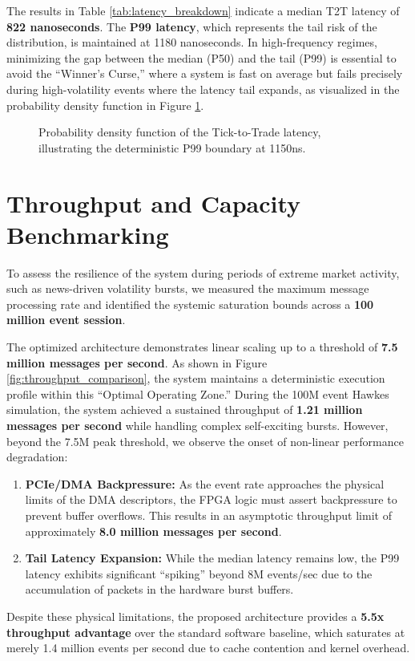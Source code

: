 The results in Table \ref{tab:latency_breakdown} indicate a median T2T latency of \textbf{822 nanoseconds}. The \textbf{P99 latency}, which represents the tail risk of the distribution, is maintained at 1180 nanoseconds. 
 In high-frequency regimes, minimizing the gap between the median (P50) and the tail (P99) is essential to avoid the ``Winner's Curse,'' where a system is fast on average but fails precisely during high-volatility events where the latency tail expands, as visualized in the probability density function in Figure \ref{fig:latency_hist}.

\begin{figure}
    \centering
    
    \caption{Probability density function of the Tick-to-Trade latency, illustrating the deterministic P99 boundary at 1150ns.}
    \label{fig:latency_hist}
\end{figure}
\clearpage

\section{Throughput and Capacity Benchmarking}
To assess the resilience of the system during periods of extreme market activity, such as news-driven volatility bursts, we measured the maximum message processing rate and identified the systemic saturation bounds across a \textbf{100 million event session}.

The optimized architecture demonstrates linear scaling up to a threshold of \textbf{7.5 million messages per second}. As shown in Figure \ref{fig:throughput_comparison}, the system maintains a deterministic execution profile within this ``Optimal Operating Zone.'' During the 100M event Hawkes simulation, the system achieved a sustained throughput of \textbf{1.21 million messages per second} while handling complex self-exciting bursts. However, beyond the 7.5M peak threshold, we observe the onset of non-linear performance degradation:
\begin{enumerate}
    \item \textbf{PCIe/DMA Backpressure:} As the event rate approaches the physical limits of the DMA descriptors, the FPGA logic must assert backpressure to prevent buffer overflows. This results in an asymptotic throughput limit of approximately \textbf{8.0 million messages per second}.
    \item \textbf{Tail Latency Expansion:} While the median latency remains low, the P99 latency exhibits significant ``spiking'' beyond 8M events/sec due to the accumulation of packets in the hardware burst buffers.
\end{enumerate}
Despite these physical limitations, the proposed architecture provides a \textbf{5.5x throughput advantage} over the standard software baseline, which saturates at merely 1.4 million events per second due to cache contention and kernel overhead.


